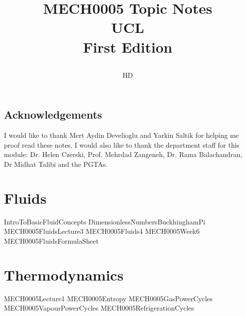 \documentclass[12pt,a4paper, twoside]{book}
\numberwithin{equation}{section}
\begin{document}
\title{
  {MECH0005 Topic Notes}\\
  {\large UCL}\\
  {\large First Edition}
  \author{HD}
}
\maketitle
{\pagestyle{plain}
\tableofcontents
\cleardoublepage}
\section*{Acknowledgements}
I would like to thank Mert Aydin Develioglu and Yarkin Saltik for helping me proof read these notes. I would also like to thank the department staff for this module: Dr. Helen Czerski, Prof. Mehrdad Zangeneh, Dr. Rama Balachandran, Dr Midhat Talibi and the PGTAs. \thispagestyle{plain}
\chapter{Fluids}
{IntroToBasicFluidConcepts}
{DimensionlessNumbersBuckhinghamPi}
{MECH0005FluidsLecture3}
{MECH0005Fluids4}
{MECH0005Week6}
{MECH0005FluidsFormulaSheet}
\chapter{Thermodynamics}
{MECH0005Lecture1}
{MECH0005Entropy}
{MECH0005GasPowerCycles}
{MECH0005VapourPowerCycles}
{MECH0005RefrigerationCycles}
\listoffigures
\end{document}
